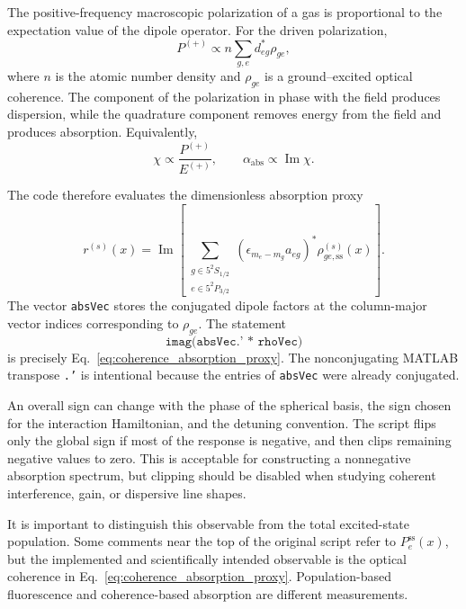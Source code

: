 The positive-frequency macroscopic polarization of a gas is proportional to
the expectation value of the dipole operator.  For the driven polarization,
\begin{equation}
P^{(+)}
\propto
n
\sum_{g,e}
d_{eg}^{*}\rho_{ge},
\label{eq:polarization_from_coherence}
\end{equation}
where \(n\) is the atomic number density and \(\rho_{ge}\) is a
ground--excited optical coherence.  The component of the polarization in
phase with the field produces dispersion, while the quadrature component
removes energy from the field and produces absorption.  Equivalently,
\begin{equation}
\chi\propto\frac{P^{(+)}}{E^{(+)}},
\qquad
\alpha_{\mathrm{abs}}\propto
\operatorname{Im}\chi.
\label{eq:susceptibility_coherence_relation}
\end{equation}

The code therefore evaluates the dimensionless absorption proxy
\begin{equation}
r^{(s)}(x)
=
\operatorname{Im}
\left[
\sum_{\substack{g\in 5^2S_{1/2}\\e\in 5^2P_{3/2}}}
\left(\epsilon_{m_e-m_g}a_{eg}\right)^{*}
\rho_{ge,\mathrm{ss}}^{(s)}(x)
\right].
\label{eq:coherence_absorption_proxy}
\end{equation}
The vector \texttt{absVec} stores the conjugated dipole factors at the
column-major vector indices corresponding to \(\rho_{ge}\).  The statement
\begin{equation}
\texttt{imag(absVec.' * rhoVec)}
\end{equation}
is precisely Eq.~\eqref{eq:coherence_absorption_proxy}.  The nonconjugating
MATLAB transpose \texttt{.'} is intentional because the entries of
\texttt{absVec} were already conjugated.

An overall sign can change with the phase of the spherical basis, the sign
chosen for the interaction Hamiltonian, and the detuning convention.  The
script flips only the global sign if most of the response is negative, and
then clips remaining negative values to zero.  This is acceptable for
constructing a nonnegative absorption spectrum, but clipping should be
disabled when studying coherent interference, gain, or dispersive line
shapes.

It is important to distinguish this observable from the total excited-state
population.  Some comments near the top of the original script refer to
\(P_e^{\mathrm{ss}}(x)\), but the implemented and scientifically intended
observable is the optical coherence in
Eq.~\eqref{eq:coherence_absorption_proxy}.  Population-based fluorescence and
coherence-based absorption are different measurements.

